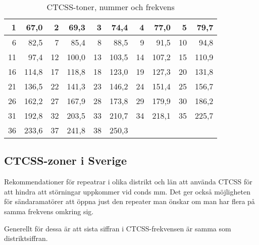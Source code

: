\begin{table}[H]
\centering
\begin{tabular}{rr|rr|rr|rr|rr}
	 1 &  67,0 &  2 &  69,3 &  3 &  74,4 &  4 &  77,0 &  5 &  79,7 \\ \hline
	 6 &  82,5 &  7 &  85,4 &  8 &  88,5 &  9 &  91,5 & 10 &  94,8 \\ \hline
	11 &  97,4 & 12 & 100,0 & 13 & 103,5 & 14 & 107,2 & 15 & 110,9 \\ \hline
	16 & 114,8 & 17 & 118,8 & 18 & 123,0 & 19 & 127,3 & 20 & 131,8 \\ \hline
	21 & 136,5 & 22 & 141,3 & 23 & 146,2 & 24 & 151,4 & 25 & 156,7 \\ \hline
	26 & 162,2 & 27 & 167,9 & 28 & 173,8 & 29 & 179,9 & 30 & 186,2 \\ \hline
	31 & 192,8 & 32 & 203,5 & 33 & 210,7 & 34 & 218,1 & 35 & 225,7 \\ \hline
	36 & 233,6 & 37 & 241,8 & 38 & 250,3 &    &       &    &
\end{tabular}
\caption{CTCSS-toner, nummer och frekvens}
\end{table}

\subsection{CTCSS-zoner i Sverige}

Rekommendationer för repeatrar i olika distrikt och län att använda CTCSS för att hindra att störningar uppkommer vid conds mm. Det ger också möjligheten för sändaramatörer att öppna just den repeater man önskar om man har flera på samma frekvens omkring sig.

Generellt för dessa är att sista siffran i CTCSS-frekvensen är samma som distriktsiffran.

